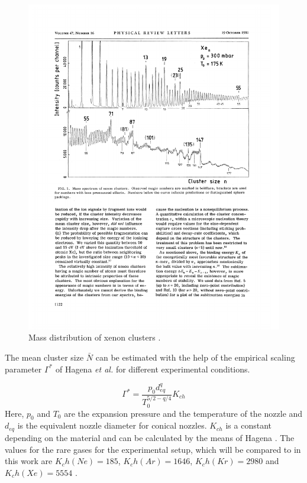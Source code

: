 \begin{figure}[h]
  \centering
  \includegraphics[scale=0.8]{pics/Xe_cluster_mass.pdf}
  \caption{Mass distribution of xenon clusters \cite{Echt81}.}
  \label{figure:Xe_cluster_mass}
\end{figure}

The mean cluster size $\bar{N}$ can be estimated with
the help of the empirical scaling parameter $\Gamma^*$ of Hagena \textit{et al.}
\cite{Hagena72,Hagena81} for different experimental conditions.

\begin{equation}
 \Gamma^* = \frac{p_0 d_{eq}^q}{T_0^{5/2-q/4}} K_{ch}
\end{equation}
Here, $p_0$ and $T_0$ are the expansion pressure and the temperature
of the nozzle and $d_{eq}$ is the equivalent nozzle diameter for conical
nozzles. $K_{ch}$ is a constant depending on the material and can be
calculated by the means of Hagena \cite{Hagena87}. The values for the rare gases for
the experimental setup, which will be compared to in this work are
$K_ch(Ne)=185$, $K_ch(Ar)=1646$, $K_ch(Kr)=2980$ and $K_ch(Xe)=5554$
\cite{PhDFoerstel}.

